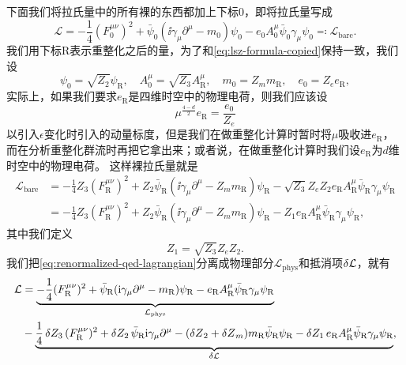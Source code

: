 下面我们将拉氏量中的所有裸的东西都加上下标0，即将拉氏量写成
\begin{equation}
    \mathcal{L} = - \frac{1}{4} (F_0^{\mu \nu})^2 + \bar{\psi}_0 (\ii \gamma_\mu \partial^\mu - m_0) \psi_0  - e_0 A^\mu_0 \bar{\psi}_0 \gamma_\mu \psi_0 \eqqcolon \mathcal{L}_\text{bare}.
\end{equation}
我们用下标R表示重整化之后的量，为了和\eqref{eq:lsz-formula-copied}保持一致，我们设
\begin{equation}
    \psi_0 = \sqrt{Z_2} \psi_\text{R}, \quad A^\mu_0 = \sqrt{Z_3} A^\mu_\text{R}, \quad m_0 = Z_m m_\text{R}, \quad e_0 = Z_e e_\text{R}, 
\end{equation}
实际上，如果我们要求$e_\text{R}$是四维时空中的物理电荷，则我们应该设
\begin{equation}
    \mu^{\frac{4-d}{2}} e_\text{R} = \frac{e_0}{Z_e}
\end{equation}
以引入$\epsilon$变化时引入的动量标度，但是我们在做重整化计算时暂时将$\mu$吸收进$e_\text{R}$，而在分析重整化群流时再把它拿出来；或者说，在做重整化计算时我们设$e_\text{R}$为$d$维时空中的物理电荷。
这样裸拉氏量就是
\begin{equation}
    \begin{aligned}
        \mathcal{L}_\text{bare} &= - \frac{1}{4} Z_3 (F_\text{R}^{\mu \nu})^2 + Z_2 \bar{\psi}_\text{R} (\ii \gamma_\mu \partial^\mu - Z_m m_\text{R}) \psi_\text{R}  - \sqrt{Z_3} Z_e Z_2 e_\text{R} A^\mu_\text{R} \bar{\psi}_\text{R} \gamma_\mu \psi_\text{R} \\
        &= - \frac{1}{4} Z_3 (F_\text{R}^{\mu \nu})^2 + Z_2 \bar{\psi}_\text{R} (\ii \gamma_\mu \partial^\mu - Z_m m_\text{R}) \psi_\text{R}  - Z_1 e_\text{R} A^\mu_\text{R} \bar{\psi}_\text{R} \gamma_\mu \psi_\text{R},
    \end{aligned}
    \label{eq:renormalized-qed-lagrangian}
\end{equation}
其中我们定义
\begin{equation}
    Z_1 = \sqrt{Z_3} Z_e Z_2 .
\end{equation}
我们把\eqref{eq:renormalized-qed-lagrangian}分离成物理部分$\mathcal{L}_\text{phys}$和抵消项$\var{\mathcal{L}}$，就有
\begin{equation}
    \begin{aligned}
        \mathcal{L} &= \underbrace{- \frac{1}{4} (F_\text{R}^{\mu \nu})^2 + \bar{\psi}_\text{R} (\mathrm{i} \gamma_\mu \partial^\mu - m_\text{R}) \psi_\text{R}  - e_\text{R} A^\mu_\text{R} \bar{\psi}_\text{R} \gamma_\mu \psi_\text{R}}_{\mathcal{L}_\text{phys}} \\
        & - \underbrace{\frac{1}{4} \var{Z_3} (F_\text{R}^{\mu \nu})^2 + \var{Z_2} \bar{\psi}_\text{R} \mathrm{i} \gamma_\mu \partial^\mu - (\var{Z}_2 + \var{Z}_m) m_\text{R} \bar{\psi}_\text{R} \psi_\text{R}  - \var{Z_1} e_\text{R} A^\mu_\text{R} \bar{\psi}_\text{R} \gamma_\mu \psi_\text{R}}_{\var{\mathcal{L}}},
    \end{aligned}
    \label{eq:separated-qed-lagrangian}
\end{equation}
